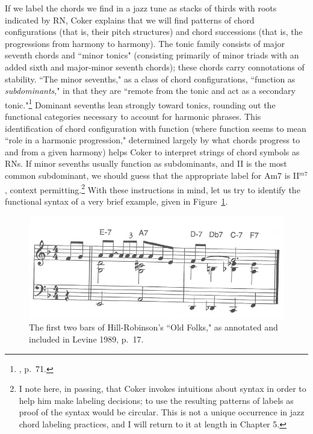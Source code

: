If we label the chords we find in a jazz tune as stacks of thirds with roots indicated by RN, Coker explains that we will find patterns of chord configurations (that is, their pitch structures) and chord successions (that is, the progressions from harmony to harmony).  The tonic family consists of major seventh chords and ``minor tonics" (consisting primarily of minor triads with an added sixth and major-minor seventh chords); these chords carry connotations of stability.  ``The minor sevenths," as a class of chord configurations, ``function as \emph{subdominants}," in that they are ``remote from the tonic and act as a secondary tonic."\footnote{\cite{coker1964}, p.\ 71.}  Dominant sevenths lean strongly toward tonics, rounding out the functional categories necessary to account for harmonic phrases.  This identification of chord configuration with function (where function seems to mean ``role in a harmonic progression," determined largely by what chords progress to and from a given harmony) helps Coker to interpret strings of chord symbols as RNs.  If minor sevenths usually function as subdominants, and II is the most common subdominant, we should guess that the appropriate label for Am7 is II$^{m7}$, context permitting.\footnote{I note here, in passing, that Coker invokes intuitions about syntax in order to help him make labeling decisions; to use the resulting patterns of labels as proof of the syntax would be circular.  This is not a unique occurrence in jazz chord labeling practices, and I will return to it at length in Chapter 5.}  With these instructions in mind, let us try to identify the functional syntax of a very brief example, given in Figure~\ref{levine_folks}.
\begin{figure}
	\centering
	\caption{The first two bars of Hill-Robinson's ``Old Folks," as annotated and included in Levine 1989, p.\ 17.}
	\label{levine_folks}
	\includegraphics[width=5in]{levine_31.png}
\end{figure}

